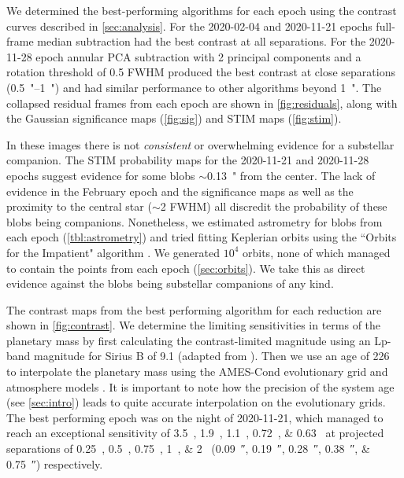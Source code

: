 \documentclass[twocolumn]{aastex631}
\begin{document}
We determined the best-performing algorithms for each epoch using the contrast curves described in \autoref{sec:analysis}. For the 2020-02-04 and 2020-11-21 epochs full-frame median subtraction had the best contrast at all separations. For the 2020-11-28 epoch annular PCA subtraction with 2 principal components and a rotation threshold of 0.5 FWHM produced the best contrast at close separations (\qtyrange{0.5}{1}{"}) and had similar performance to other algorithms beyond \qty{1}{"}. The collapsed residual frames from each epoch are shown in \autoref{fig:residuals}, along with the Gaussian significance maps (\autoref{fig:sig}) and STIM maps (\autoref{fig:stim}).

In these images there is not \textit{consistent} or overwhelming evidence for a substellar companion. The STIM probability maps for the 2020-11-21 and 2020-11-28 epochs suggest evidence for some blobs $\sim$\qty{0.13}{"} from the center. The lack of evidence in the February epoch and the significance maps as well as the proximity to the central star ($\sim$2 FWHM) all discredit the probability of these blobs being companions. Nonetheless, we estimated astrometry for blobs from each epoch (\autoref{tbl:astrometry}) and tried fitting Keplerian orbits using the ``Orbits for the Impatient" algorithm \citep[OFTI;][]{blunt_orbits_2017}. We generated $10^4$ orbits, none of which managed to contain the points from each epoch (\autoref{sec:orbits}). We take this as direct evidence against the blobs being substellar companions of any kind.

The contrast maps from the best performing algorithm for each reduction are shown in \autoref{fig:contrast}. We determine the limiting sensitivities in terms of the planetary mass by first calculating the contrast-limited magnitude using an Lp-band magnitude for Sirius B of 9.1 (adapted from \citealp{bonnet-bidaud_adonis_2008}). Then we use an age of \qty{226}{\mega\year} to interpolate the planetary mass using the AMES-Cond evolutionary grid and atmosphere models \citep{allard_models_2012}. It is important to note how the precision of the system age (see \autoref{sec:intro}) leads to quite accurate interpolation on the evolutionary grids. The best performing epoch was on the night of 2020-11-21, which managed to reach an exceptional sensitivity of \qtylist[list-units=single]{3.5;1.9;1.1;0.72;0.63}{\mj} at projected separations of \qtylist[list-units=single]{0.25;0.5;0.75;1;2}{\au} (\qtylist[list-units=single]{0.09;0.19;0.28;0.38;0.75}{\arcsecond}) respectively.
\end{document}
